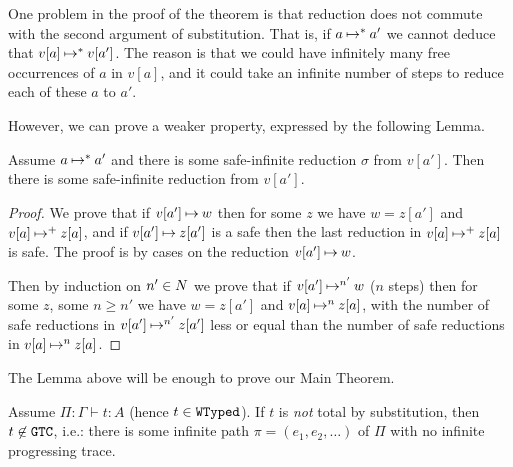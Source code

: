 One problem in the proof of the theorem 
is that reduction does not commute with the second argument of substitution. 
That is, if $a \mathbin{\mapsto}^* a'$ we cannot deduce that $v[a] \mathbin{\mapsto}^* v[a']$. 
The reason is that we could have infinitely many free occurrences of $a$ in $v[a]$, and it could take
an infinite number of steps to reduce each of these $a$ to $a'$.

However, we can prove a weaker property, expressed by the following Lemma.

\begin{lemma}
 \label{lemma-safe-infinite-substitution}
 Assume $a \mathbin{\mapsto}^* a'$ and there is some safe-infinite reduction $\sigma$ from $v[a']$.
 Then there is some safe-infinite reduction from $v[a']$.
\end{lemma}

\begin{proof}
We prove that if $v[a'] \mathbin{\mapsto} w$ then for some $z$ we have $w=z[a']$ and $v[a] \mathbin{\mapsto}^+ z[a]$,
and if $v[a'] \mathbin{\mapsto} z[a']$ is a safe then the last reduction in $v[a] \mathbin{\mapsto}^+ z[a]$ is safe.
The proof is by cases on the reduction $v[a'] \mathbin{\mapsto} w$.

Then by induction on $n' \in {N}$ we prove that if $v[a'] \mathbin{\mapsto}^{n'} w$ ($n$ steps) 
then for some $z$, some $n \ge n'$ we have $w=z[a']$ and $v[a] \mathbin{\mapsto}^{n} z[a]$,
with the number of safe reductions in  $v[a'] \mathbin{\mapsto}^{n'} z[a']$ less or equal than the number
of safe reductions in $v[a] \mathbin{\mapsto}^{n} z[a]$.

\end{proof}

The Lemma above will be enough to prove our Main Theorem.


\begin{theorem}
\label{theorem-main-finite-safe-reduction}
  Assume $\Pi:\Gamma\vdash t : A$ (hence $t\in {\tt WTyped}$).
  If $t$ is \emph{not} total by substitution, then $t \not \in {\tt GTC}$, i.e.:
  there is some infinite path $\pi = (e_1, e_2, \ldots)$ of $\Pi$ with no infinite progressing trace. 
\end{theorem}




